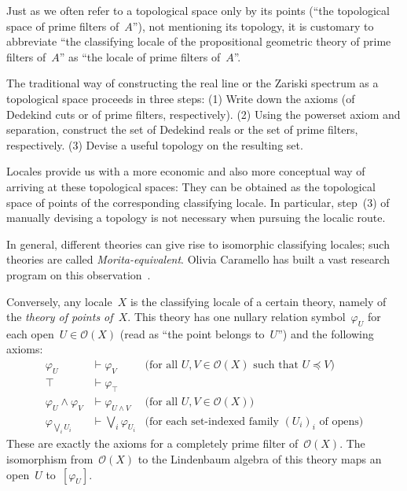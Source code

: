 \documentclass{ws-rv9x6}
\renewcommand{\O}{\mathcal{O}}
\renewcommand{\_}{\mathpunct{.}}
\newcommand{\?}{\,{:}\,}
\begin{document}
Just as we often refer to a topological space only by its points (``the
topological space of prime filters of~$A$''), not mentioning its topology, it is
customary to abbreviate ``the classifying locale of the propositional geometric
theory of prime filters of~$A$'' as ``the locale of prime filters of~$A$''.

\begin{remark}\label{rem:traditional-spaces}
The traditional way of constructing the real line or the Zariski
spectrum as a topological space proceeds in three steps: (1) Write down the
axioms (of Dedekind cuts or of prime filters, respectively). (2) Using the powerset
axiom and separation, construct the set of Dedekind reals or the set
of prime filters, respectively. (3) Devise a useful topology on the resulting set.

Locales provide us with a more economic and also more conceptual way of
arriving at these topological spaces: They can be obtained as the topological
space of points of the corresponding classifying locale. In particular,
step~(3) of manually devising a topology is not necessary when pursuing the
localic route.
\end{remark}

In general, different theories can give rise to isomorphic classifying locales;
such theories are called \emph{Morita-equivalent}. Olivia Caramello has built a vast research program
on this observation~\cite{caramello:tst}.

Conversely, any locale~$X$ is the classifying locale of a certain theory, namely
of the \emph{theory of points of~$X$}. This theory has one nullary relation
symbol~$\varphi_U$ for each open~$U \in \O(X)$ (read as ``the point belongs
to~$U$'') and the following axioms:
\begin{align*}
  \varphi_U &\vdash \varphi_V & \text{(for all~$U,V \in \O(X)$ such that~$U \preceq V$)} \\
  \top &\vdash \varphi_\top \\
  \varphi_U \wedge \varphi_V &\vdash \varphi_{U \wedge V} & \text{(for all~$U,V \in \O(X)$)} \\
  \varphi_{\bigvee_i U_i} &\vdash \bigvee_i \varphi_{U_i} & \text{(for each set-indexed family~$(U_i)_i$ of opens)}
\end{align*}
These are exactly the axioms for a completely prime filter of~$\O(X)$. The
isomorphism from~$\O(X)$ to the Lindenbaum algebra of this theory maps an
open~$U$ to~$[\varphi_U]$.
\end{document}
